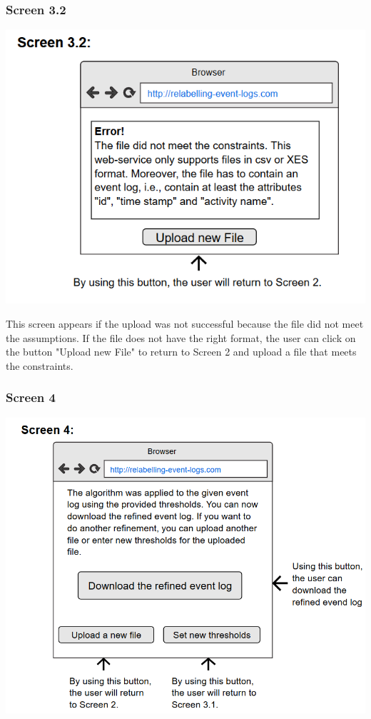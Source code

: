 \documentclass[notitlepage]{article}
\begin{document}
\begin{flushleft}
\subsubsection{Screen 3.2}
\includegraphics[scale=0.9]{InterfaceMockup3-2.png}

This screen appears if the upload was not successful because the file did not meet the assumptions. If the file does not have the right format, the user can click on the button "Upload new File" to return to Screen 2 and upload a file that meets the constraints.


\subsubsection{Screen 4}
\includegraphics[scale=0.8]{InterfaceMockup4.png}


\end{flushleft}
\end{document}
